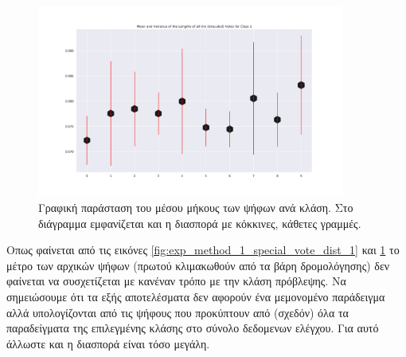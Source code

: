 \begin{figure}[h]

    \centering
    \includegraphics[width=0.9\textwidth]{images/chapter experiments/method 1/image 12/mean_var_for_class_1_unscaled_True.pdf}
    \caption{Γραφική παράσταση του μέσου μήκους των ψήφων ανά κλάση. Στο διάγραμμα εμφανίζεται και η διασπορά με κόκκινες, κάθετες γραμμές.}
    \label{fig:exp_method_1_special_vote_dist_2}
    
  \end{figure}

Οπως φαίνεται από τις εικόνες \ref{fig:exp_method_1_special_vote_dist_1} και \ref{fig:exp_method_1_special_vote_dist_2} το μέτρο των αρχικών ψήφων (πρωτού κλιμακωθούν από τα βάρη δρομολόγησης) δεν φαίνεται να συσχετίζεται με κανέναν τρόπο με την κλάση πρόβλεψης. Να σημειώσουμε ότι τα εξής αποτελέσματα δεν αφορούν ένα μεμονομένο παράδειγμα αλλά υπολογίζονται από τις ψήφους που προκύπτουν από (σχεδόν) όλα τα παραδείγματα της επιλεγμένης κλάσης στο σύνολο δεδομενων ελέγχου. Για αυτό άλλωστε και η διασπορά είναι τόσο μεγάλη.

